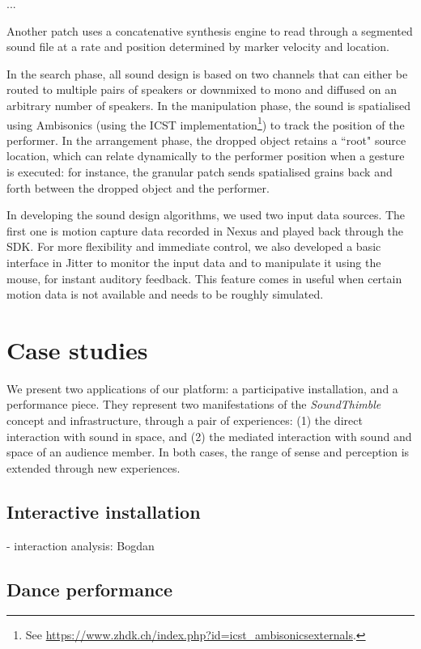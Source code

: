 \documentclass{nime-alternate}
\begin{document}
...

Another patch uses a concatenative synthesis engine to read through a segmented sound file at a rate and position determined by marker velocity and location.

In the search phase, all sound design is based on two channels that can either be routed to multiple pairs of speakers or downmixed to mono and diffused on an arbitrary number of speakers. In the manipulation phase, the sound is spatialised using Ambisonics (using the ICST implementation\footnote{See \url{https://www.zhdk.ch/index.php?id=icst_ambisonicsexternals}.}) to track the position of the performer. In the arrangement phase, the dropped object retains a ``root" source location, which can relate dynamically to the performer position when a gesture is executed: for instance, the granular patch sends spatialised grains back and forth between the dropped object and the performer.

In developing the sound design algorithms, we used two input data sources. The first one is motion capture data recorded in Nexus and played back through the SDK. For more flexibility and immediate control, we also developed a basic interface in Jitter to monitor the input data and to manipulate it using the mouse, for instant auditory feedback. This feature comes in useful when certain motion data is not available and needs to be roughly simulated.



\section{Case studies}
\label{sec:case}

We present two applications of our platform: a participative installation, and a performance piece. They represent two manifestations of the \textit{SoundThimble} concept and infrastructure, through a pair of experiences: (1) the direct interaction with sound in space, and (2) the mediated interaction with sound and space of an audience member. In both cases, the range of sense and perception is extended through new experiences.


\subsection{Interactive installation}

- interaction analysis: Bogdan

\subsection{Dance performance}
\end{document}
